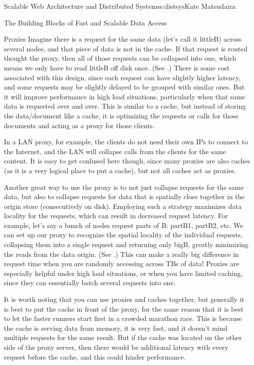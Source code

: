 \begin{aosachapter}{Scalable Web Architecture and Distributed Systems}{s:distsys}{Kate Matsudaira}
\begin{aosasect1}{The Building Blocks of Fast and Scalable Data Access}
\begin{aosasect2}{Proxies}
Imagine there is a request for the same data (let's call it littleB)
across several nodes, and that piece of data is not in the cache. If
that request is routed thought the proxy, then all of those requests
can be collapsed into one, which means we only have to read littleB
off disk once. (See .) There is some cost associated with this design, since
each request can have slightly higher latency, and some requests may
be slightly delayed to be grouped with similar ones. But it will
improve performance in high load situations, particularly when that
same data is requested over and over. This is similar to a cache, but
instead of storing the data/document like a cache, it is optimizing
the requests or calls for those documents and acting as a proxy for
those clients. 

In a LAN proxy, for example, the clients do not need
their own IPs to connect to the Internet, and the LAN will collapse
calls from the clients for the same content. It is easy to get
confused here though, since many proxies are also caches (as it is a
very logical place to put a cache), but not all caches act as proxies.


Another great way to use the proxy is to not just collapse requests
for the same data, but also to collapse requests for data that is
spatially close together in the origin store (consecutively on disk).
Employing such a strategy maximizes data locality for the requests,
which can result in decreased request latency. For example, let's say
a bunch of nodes request parts of B: partB1, partB2, etc. We can
set up our proxy to recognize the spatial locality of the individual
requests, collapsing them into a single request and returning only
bigB, greatly minimizing the reads from the data origin. (See .) This can make
a really big difference in request time when you are randomly
accessing across TBs of data! Proxies are especially helpful under
high load situations, or when you have limited caching, since they
can essentially batch several requests into one.


It is worth noting that you can use proxies and caches together, but
generally it is best to put the cache in front of the proxy,
for the same reason that it is best to let the faster runners start first in a
crowded marathon race. This is because the cache is serving data from
memory, it is very fast, and it doesn't mind multiple requests for the
same result. But if the cache was located on the other side of the
proxy server, then there would be additional latency with every
request before the cache, and this could hinder performance.


\end{aosasect2}
\end{aosasect1}
\end{aosachapter}
